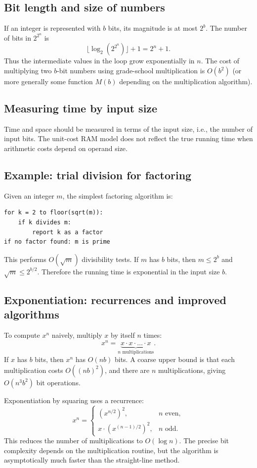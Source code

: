 \documentclass[11pt]{article}
\begin{document}
\subsection*{Bit length and size of numbers}
If an integer is represented with $b$ bits, its magnitude is at most $2^b$. The number of bits in
$2^{2^n}$ is
\[
\lfloor \log_2(2^{2^n}) \rfloor + 1 = 2^n + 1.
\]
Thus the intermediate values in the loop grow exponentially in $n$. The cost of multiplying two
$b$-bit numbers using grade-school multiplication is $O(b^2)$ (or more generally some function
$M(b)$ depending on the multiplication algorithm).

\subsection*{Measuring time by input size}
Time and space should be measured in terms of the input size, i.e., the number of input bits. The
unit-cost RAM model does not reflect the true running time when arithmetic costs depend on operand
size.

\subsection*{Example: trial division for factoring}
Given an integer $m$, the simplest factoring algorithm is:

\begin{verbatim}
for k = 2 to floor(sqrt(m)):
	if k divides m:
		report k as a factor
if no factor found: m is prime
\end{verbatim}

This performs $O(\sqrt{m})$ divisibility tests. If $m$ has $b$ bits, then $m \le 2^b$ and
\(\sqrt{m} \le 2^{b/2}\). Therefore the running time is exponential in the input size $b$.

\subsection*{Exponentiation: recurrences and improved algorithms}
To compute $x^n$ naively, multiply $x$ by itself $n$ times:
\[
x^n = \underbrace{x \cdot x \cdot \ldots \cdot x}_{n \text{ multiplications}}.
\]
If $x$ has $b$ bits, then $x^n$ has $O(nb)$ bits. A coarse upper bound is that each multiplication
costs $O((nb)^2)$, and there are $n$ multiplications, giving $O(n^3 b^2)$ bit operations.

Exponentiation by squaring uses a recurrence:
\[
x^n =
\begin{cases}
\left(x^{n/2}\right)^2, & n \text{ even}, \\
x \cdot \left(x^{(n-1)/2}\right)^2, & n \text{ odd}.
\end{cases}
\]
This reduces the number of multiplications to $O(\log n)$. The precise bit complexity depends on
the multiplication routine, but the algorithm is asymptotically much faster than the straight-line
method.
\end{document}
